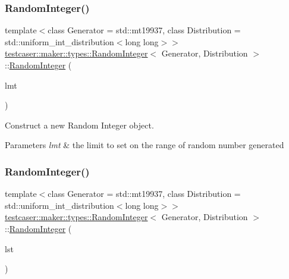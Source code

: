\subsubsection{\texorpdfstring{RandomInteger()}{RandomInteger()}\hspace{0.1cm}{\footnotesize\ttfamily [2/3]}}
{\footnotesize\ttfamily template$<$class Generator = std\+::mt19937, class Distribution = std\+::uniform\+\_\+int\+\_\+distribution$<$long long$>$$>$ \\
\mbox{\hyperlink{classtestcaser_1_1maker_1_1types_1_1RandomInteger}{testcaser\+::maker\+::types\+::\+Random\+Integer}}$<$ Generator, Distribution $>$\+::\mbox{\hyperlink{classtestcaser_1_1maker_1_1types_1_1RandomInteger}{Random\+Integer}} (\begin{DoxyParamCaption}\item[{\mbox{\hyperlink{structtestcaser_1_1maker_1_1RandomIntegerLimit}{testcaser\+::maker\+::\+Random\+Integer\+Limit}}}]{lmt }\end{DoxyParamCaption})\hspace{0.3cm}{\ttfamily [inline]}}



Construct a new Random Integer object. 


\begin{DoxyParams}{Parameters}
{\em lmt} & the limit to set on the range of random number generated \\
\hline
\end{DoxyParams}
\mbox{\label{classtestcaser_1_1maker_1_1types_1_1RandomInteger_ae126be1bc8d04520b063924e57ccedc6}} 
\subsubsection{\texorpdfstring{RandomInteger()}{RandomInteger()}\hspace{0.1cm}{\footnotesize\ttfamily [3/3]}}
{\footnotesize\ttfamily template$<$class Generator = std\+::mt19937, class Distribution = std\+::uniform\+\_\+int\+\_\+distribution$<$long long$>$$>$ \\
\mbox{\hyperlink{classtestcaser_1_1maker_1_1types_1_1RandomInteger}{testcaser\+::maker\+::types\+::\+Random\+Integer}}$<$ Generator, Distribution $>$\+::\mbox{\hyperlink{classtestcaser_1_1maker_1_1types_1_1RandomInteger}{Random\+Integer}} (\begin{DoxyParamCaption}\item[{std\+::initializer\+\_\+list$<$ long long $>$}]{lst }\end{DoxyParamCaption})\hspace{0.3cm}{\ttfamily [inline]}}



